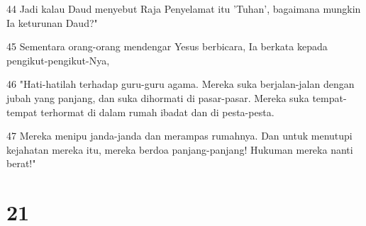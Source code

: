 \par 44 Jadi kalau Daud menyebut Raja Penyelamat itu 'Tuhan', bagaimana mungkin Ia keturunan Daud?"
\par 45 Sementara orang-orang mendengar Yesus berbicara, Ia berkata kepada pengikut-pengikut-Nya,
\par 46 "Hati-hatilah terhadap guru-guru agama. Mereka suka berjalan-jalan dengan jubah yang panjang, dan suka dihormati di pasar-pasar. Mereka suka tempat-tempat terhormat di dalam rumah ibadat dan di pesta-pesta.
\par 47 Mereka menipu janda-janda dan merampas rumahnya. Dan untuk menutupi kejahatan mereka itu, mereka berdoa panjang-panjang! Hukuman mereka nanti berat!"

\chapter{21}

